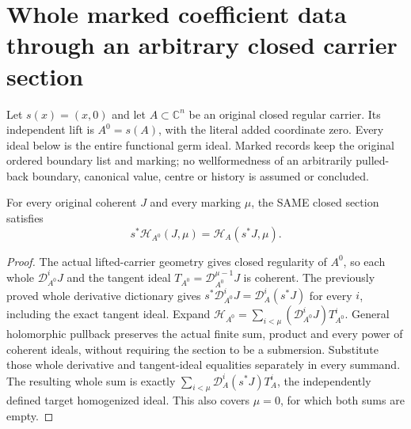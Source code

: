 \section{Whole marked coefficient data through an arbitrary closed carrier section}

Let $s(x)=(x,0)$ and let $A\subset\mathbb C^n$ be an original closed regular carrier. Its independent lift is $A^0=s(A)$, with the literal added coordinate zero. Every ideal below is the entire functional germ ideal. Marked records keep the original ordered boundary list and marking; no wellformedness of an arbitrarily pulled-back boundary, canonical value, centre or history is assumed or concluded.

\begin{theorem}
\label{hir:actual-zero-section-submanifold-whole-homogenized-ideal}
\leanok
For every original coherent $J$ and every marking $\mu$, the SAME closed section satisfies
\[
 s^*\mathcal H_{A^0}(J,\mu)=\mathcal H_A(s^*J,\mu).
\]
\end{theorem}
\begin{proof}
The actual lifted-carrier geometry gives closed regularity of $A^0$, so each whole $\mathcal D_{A^0}^iJ$ and the tangent ideal $T_{A^0}=\mathcal D_{A^0}^{\mu-1}J$ is coherent. The previously proved whole derivative dictionary gives $s^*\mathcal D_{A^0}^iJ=\mathcal D_A^i(s^*J)$ for every $i$, including the exact tangent ideal. Expand $\mathcal H_{A^0}=\sum_{i<\mu}(\mathcal D_{A^0}^iJ)T_{A^0}^i$. General holomorphic pullback preserves the actual finite sum, product and every power of coherent ideals, without requiring the section to be a submersion. Substitute those whole derivative and tangent-ideal equalities separately in every summand. The resulting whole sum is exactly $\sum_{i<\mu}\mathcal D_A^i(s^*J)T_A^i$, the independently defined target homogenized ideal. This also covers $\mu=0$, for which both sums are empty.
\end{proof}

